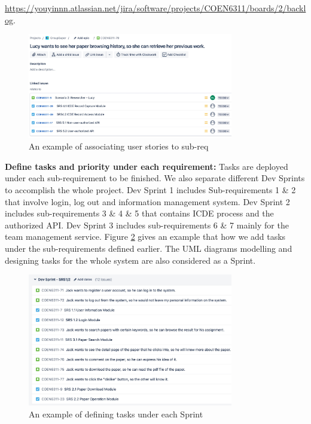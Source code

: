 \documentclass[]{article}
\begin{document}
\url{https://youyinnn.atlassian.net/jira/software/projects/COEN6311/boards/2/backlog}.

\begin{figure}[htp]
	\centering
	\includegraphics[width=0.8\textwidth]{./img/subreq_example.jpeg}
	\caption{An example of associating user stories to sub-req}
	\label{fig:subreq_example}
\end{figure}

\textbf{Define tasks and priority under each requirement: }Tasks are deployed under each sub-requirement to be finished. We also separate different Dev Sprints to accomplish the whole project. Dev Sprint 1 includes Sub-requirements 1 \& 2 that involve login, log out and information management system. Dev Sprint 2 includes sub-requirements 3 \& 4 \& 5 that contains ICDE process and the authorized API. Dev Sprint 3 includes sub-requirements 6 \& 7 mainly for the team management service. Figure \ref{fig:devsprint} gives an example that how we add tasks under the sub-requirements defined earlier. The UML diagrams modelling and designing tasks for the whole system are also considered as a Sprint.

\begin{figure}[htp]
	\centering
	\includegraphics[width=0.8\textwidth]{./img/devsprint.jpeg}
	\caption{An example of defining tasks under each Sprint}
	\label{fig:devsprint}
\end{figure}
\end{document}
